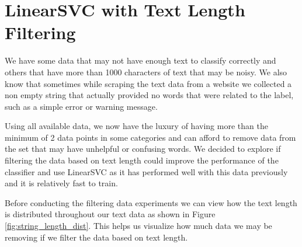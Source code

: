 \section{LinearSVC with Text Length Filtering} 

We have some data that may not have enough text to classify correctly and others that have more than 1000 characters of text that may be noisy. We also know that sometimes while scraping the text data from a website we collected a non empty string that actually provided no words that were related to the label, such as a simple error or warning message.

Using all available data, we now have the luxury of having more than the minimum of 2 data points in some categories and can afford to remove data from the set that may have unhelpful or confusing words. We decided to explore if filtering the data based on text length could improve the performance of the classifier and use LinearSVC as it has performed well with this data previously and it is relatively fast to train.

Before conducting the filtering data experiments we can view how the text length is distributed throughout our text data as shown in Figure \ref{fig:string_length_dist}. This helps us visualize how much data we may be removing if we filter the data based on text length.

